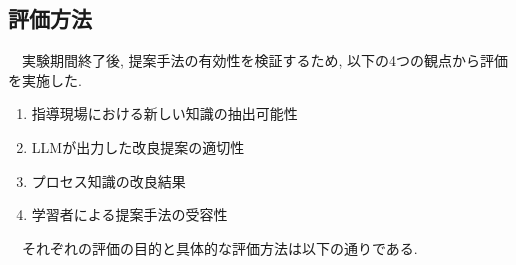



\subsection{評価方法}
　実験期間終了後, 提案手法の有効性を検証するため, 以下の4つの観点から評価を実施した. \\
\begin{enumerate}
    \item 指導現場における新しい知識の抽出可能性
    \item LLMが出力した改良提案の適切性
    \item プロセス知識の改良結果
    \item 学習者による提案手法の受容性
\end{enumerate}
　それぞれの評価の目的と具体的な評価方法は以下の通りである.

